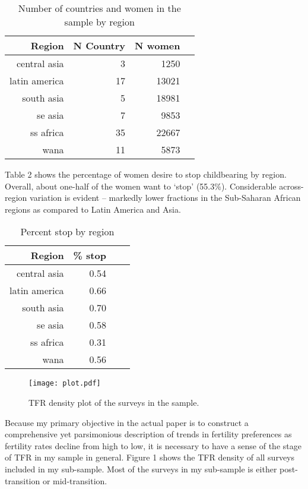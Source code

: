 \documentclass[12pt]{article}
\begin{document}
\begin{table}[ht]
\centering
\begin{tabular}{rrrr}
  \hline
 Region & N Country & N women \\ 
  \hline
 central asia & 3 & 1250 \\ 
 latin america & 17 & 13021 \\ 
 south asia & 5 & 18981\\ 
 se asia & 7 & 9853 \\ 
 ss africa & 35 & 22667\\ 
 wana & 11 & 5873\\ 
   \hline
\end{tabular}
\caption{Number of countries and women in the sample by region} 
\label{tab:table1}
\end{table}

Table 2 shows the percentage of women desire to stop childbearing by region. 
Overall, about one-half of the women want to `stop' (55.3\%). Considerable across-region variation is evident -- markedly lower fractions in the Sub-Saharan African regions as compared to Latin America and Asia. 

\begin{table}[ht]
\centering
\begin{tabular}{rrrr}
  \hline
 Region & \% stop \\ 
  \hline
 central asia & 0.54 \\ 
 latin america & 0.66 \\ 
 south asia & 0.70 \\ 
 se asia & 0.58 \\ 
 ss africa & 0.31 \\ 
 wana & 0.56 \\ 
   \hline
\end{tabular}
\caption{Percent stop by region} 
\label{tab:table2}
\end{table}

\begin{figure}[htbp]
\begin{center}
\texttt{[image: plot.pdf]}
\caption{TFR density plot of the surveys in the sample.}
\label{fig:parabola1}
\end{center}
\end{figure}

Because my primary objective in the actual paper is to construct a comprehensive yet parsimonious description of trends in fertility preferences as fertility rates decline from high to low, it is necessary to have a sense of the stage of TFR in my sample in general. Figure 1 shows the TFR density of all surveys included in my sub-sample. Most of the surveys in my sub-sample is either post-transition or mid-transition. 






\end{document}
